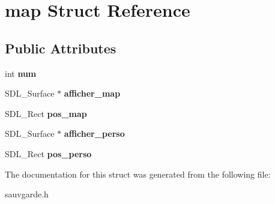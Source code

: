 \hypertarget{structmap}{}\section{map Struct Reference}
\label{structmap}
\subsection*{Public Attributes}
\begin{DoxyCompactItemize}
\item 
\mbox{\label{structmap_a56b034ffffc451092037f90fe6b87f3f}} 
int {\bfseries num}
\item 
\mbox{\label{structmap_a65e651a3045da495ef0890bd27ca22c0}} 
S\+D\+L\+\_\+\+Surface $\ast$ {\bfseries afficher\+\_\+map}
\item 
\mbox{\label{structmap_a892e2b0bcb168e8a85bd000b1bda0611}} 
S\+D\+L\+\_\+\+Rect {\bfseries pos\+\_\+map}
\item 
\mbox{\label{structmap_a0e322ac96ba8d343c516985a987caea1}} 
S\+D\+L\+\_\+\+Surface $\ast$ {\bfseries afficher\+\_\+perso}
\item 
\mbox{\label{structmap_a49128d68d1e6ea2af7bf0d137131da03}} 
S\+D\+L\+\_\+\+Rect {\bfseries pos\+\_\+perso}
\end{DoxyCompactItemize}


The documentation for this struct was generated from the following file\+:\begin{DoxyCompactItemize}
\item 
sauvgarde.\+h\end{DoxyCompactItemize}
